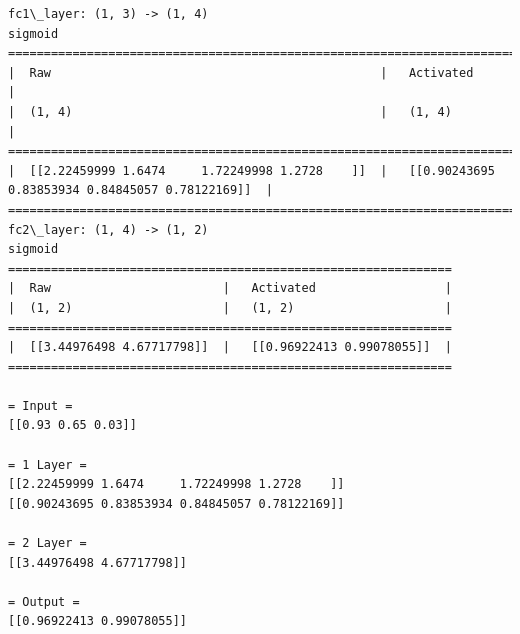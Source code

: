 \documentclass[11pt]{article}
\begin{document}
    \begin{Verbatim}[commandchars=\\\{\}]
fc1\_layer:	(1, 3) -> (1, 4)
sigmoid
==========================================================================================================
|  Raw                                              |   Activated                                        |
|  (1, 4)                                           |   (1, 4)                                           |
==========================================================================================================
|  [[2.22459999 1.6474     1.72249998 1.2728    ]]  |   [[0.90243695 0.83853934 0.84845057 0.78122169]]  |
==========================================================================================================
fc2\_layer:	(1, 4) -> (1, 2)
sigmoid
==============================================================
|  Raw                        |   Activated                  |
|  (1, 2)                     |   (1, 2)                     |
==============================================================
|  [[3.44976498 4.67717798]]  |   [[0.96922413 0.99078055]]  |
==============================================================

= Input =
[[0.93 0.65 0.03]]

= 1 Layer =
[[2.22459999 1.6474     1.72249998 1.2728    ]]
[[0.90243695 0.83853934 0.84845057 0.78122169]]

= 2 Layer =
[[3.44976498 4.67717798]]

= Output =
[[0.96922413 0.99078055]]



\end{Verbatim}
\end{document}
